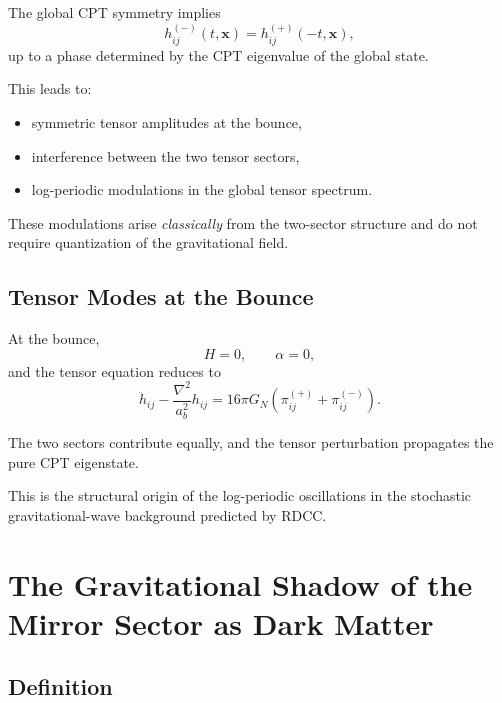 \documentclass[11pt,a4paper]{article}
\begin{document}
The global CPT symmetry implies
\begin{equation}
h_{ij}^{(-)}(t,\mathbf{x}) = h_{ij}^{(+)}(-t,\mathbf{x}),
\end{equation}
up to a phase determined by the CPT eigenvalue of the global state.

This leads to:

\begin{itemize}
\item symmetric tensor amplitudes at the bounce,
\item interference between the two tensor sectors,
\item log-periodic modulations in the global tensor spectrum.
\end{itemize}

These modulations arise \emph{classically} from the two-sector structure and do not require quantization of the gravitational field.

\subsection{Tensor Modes at the Bounce}

At the bounce,
\begin{equation}
H = 0, \qquad \alpha = 0,
\end{equation}
and the tensor equation reduces to
\begin{equation}
\ddot{h}_{ij} - \frac{\nabla^2}{a_b^2} h_{ij}
= 16\pi G_N \left( \pi_{ij}^{(+)} + \pi_{ij}^{(-)} \right).
\end{equation}

The two sectors contribute equally, and the tensor perturbation propagates the pure CPT eigenstate.

This is the structural origin of the log-periodic oscillations in the stochastic gravitational-wave background predicted by RDCC.

\section{The Gravitational Shadow of the Mirror Sector as Dark Matter}

\subsection{Definition}
\end{document}
